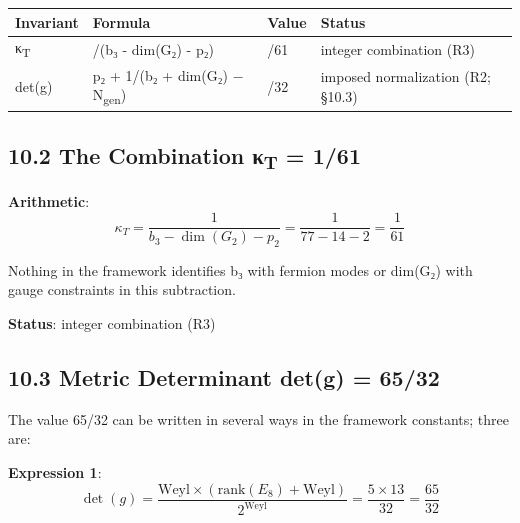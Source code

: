 \documentclass[11pt,a4paper]{article}
\begin{document}
\begin{longtable}[]{@{}
  >{\raggedright\arraybackslash}p{}
  >{\raggedright\arraybackslash}p{}
  >{\raggedright\arraybackslash}p{}
  >{\raggedright\arraybackslash}p{}@{}}
\toprule\noalign{}
\begin{minipage}[b]{\linewidth}\raggedright
Invariant
\end{minipage} & \begin{minipage}[b]{\linewidth}\raggedright
Formula
\end{minipage} & \begin{minipage}[b]{\linewidth}\raggedright
Value
\end{minipage} & \begin{minipage}[b]{\linewidth}\raggedright
Status
\end{minipage} \\
\midrule\noalign{}
\endhead
\bottomrule\noalign{}
\endlastfoot
κ\textsubscript{T} & 1/(b₃ - dim(G₂) - p₂) & 1/61 & integer combination (R3) \\
det(g) & p₂ + 1/(b₂ + dim(G₂) − N\textsubscript{gen}) & 65/32 & imposed normalization (R2; §10.3) \\
\end{longtable}

\subsection{10.2 The Combination κ\textsubscript{T} = 1/61}\label{the-combination-ux3ba_t-161}

\textbf{Arithmetic}: \[\kappa_T = \frac{1}{b_3 - \dim(G_2) - p_2} = \frac{1}{77 - 14 - 2} = \frac{1}{61}\]

Nothing in the framework identifies b₃ with fermion modes or dim(G₂) with gauge constraints in this subtraction.

\textbf{Status}: integer combination (R3)

\subsection{10.3 Metric Determinant det(g) = 65/32}\label{metric-determinant-detg-6532}

The value 65/32 can be written in several ways in the framework constants; three are:

\textbf{Expression 1}: \[\det(g) = \frac{\text{Weyl} \times (\text{rank}(E_8) + \text{Weyl})}{2^{\text{Weyl}}} = \frac{5 \times 13}{32} = \frac{65}{32}\]
\end{document}
